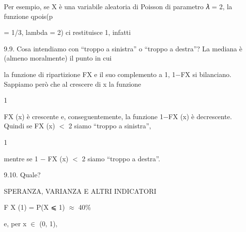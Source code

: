 \documentclass[a4paper,portrait,12pt]{article}
\begin{document}
\begin{flushleft}
Per esempio, se X \`{e} una variabile aleatoria di Poisson di parametro 𝜆 = 2, la funzione qpois(p
\end{flushleft}


\begin{flushleft}
= 1/3, lambda = 2) ci restituisce 1, infatti
\end{flushleft}


\begin{flushleft}
9.9. Cosa intendiamo con {``}troppo a sinistra'' o {``}troppo a destra''? La mediana \`{e} (almeno moralmente) il punto in cui
\end{flushleft}


\begin{flushleft}
la funzione di ripartizione FX e il suo complemento a 1, 1$-$FX si bilanciano. Sappiamo per\`{o} che al crescere di x la funzione
\end{flushleft}


1


\begin{flushleft}
FX (x) \`{e} crescente e, conseguentemente, la funzione 1$-$FX (x) \`{e} decrescente. Quindi se FX (x) $<$ 2 siamo {``}troppo a sinistra'',
\end{flushleft}


1


\begin{flushleft}
mentre se 1 $-$ FX (x) $<$ 2 siamo {``}troppo a destra''.
\end{flushleft}


\begin{flushleft}
9.10. Quale?
\end{flushleft}










\begin{flushleft}
SPERANZA, VARIANZA E ALTRI INDICATORI
\end{flushleft}





\begin{flushleft}
F X (1) = P(X ⩽ 1) $\approx$ 40\%
\end{flushleft}


\begin{flushleft}
e, per x $\in$ (0, 1),
\end{flushleft}
\end{document}
